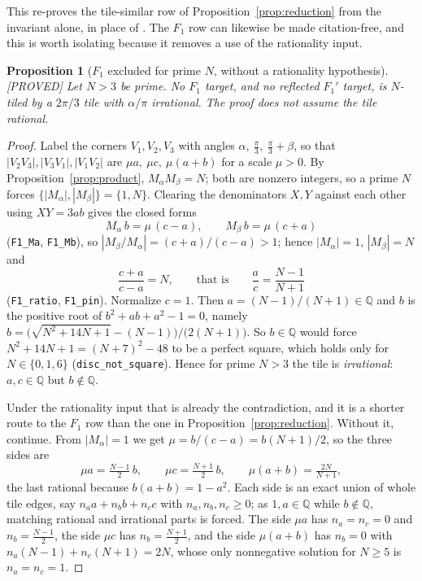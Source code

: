 \documentclass[11pt,reqno]{amsart}
\theoremstyle{plain}
\newtheorem{proposition}[theorem]{Proposition}
\theoremstyle{definition}
\newcommand{\Q}{\mathbb{Q}}
\newcommand{\lab}[1]{\hfill\textnormal{\footnotesize\textsc{[#1]}}}
\begin{document}
\noindent This re-proves the tile-similar row of Proposition~\ref{prop:reduction} from the invariant
alone, in place of \cite{SWW, BeesonI}. The $F_1$ row can likewise be made citation-free, and this is
worth isolating because it removes a use of the rationality input.

\begin{proposition}[$F_1$ excluded for prime $N$, without a rationality hypothesis]\label{prop:F1free}\lab{PROVED}
Let $N>3$ be prime. No $F_1$ target, and no reflected $F_1'$ target, is $N$-tiled by a $2\pi/3$ tile
with $\alpha/\pi$ irrational. The proof does not assume the tile rational.
\end{proposition}

\begin{proof}
Label the corners $V_1,V_2,V_3$ with angles $\alpha,\ \frac\pi3,\ \frac\pi3+\beta$, so that
$|V_2V_3|,|V_3V_1|,|V_1V_2|$ are $\mu a,\ \mu c,\ \mu(a+b)$ for a scale $\mu>0$. By
Proposition~\ref{prop:product}, $M_\alpha M_\beta=N$; both are nonzero integers, so a prime $N$
forces $\{|M_\alpha|,|M_\beta|\}=\{1,N\}$. Clearing the denominators $X,Y$ against each other using
$XY=3ab$ gives the closed forms
\[
M_\alpha\,b=\mu\,(c-a),\qquad M_\beta\,b=\mu\,(c+a)
\]
(\texttt{F1\_Ma}, \texttt{F1\_Mb}), so $|M_\beta/M_\alpha|=(c+a)/(c-a)>1$; hence $|M_\alpha|=1$,
$|M_\beta|=N$ and
\[
\frac{c+a}{c-a}=N,\qquad\text{that is}\qquad \frac ac=\frac{N-1}{N+1}
\]
(\texttt{F1\_ratio}, \texttt{F1\_pin}). Normalize $c=1$. Then $a=(N-1)/(N+1)\in\Q$ and $b$ is the
positive root of $b^2+ab+a^2-1=0$, namely
$b=\bigl(\sqrt{N^2+14N+1}-(N-1)\bigr)/\bigl(2(N+1)\bigr)$. So $b\in\Q$ would force
$N^2+14N+1=(N+7)^2-48$ to be a perfect square, which holds only for $N\in\{0,1,6\}$
(\texttt{disc\_not\_square}). Hence for prime $N>3$ the tile is \emph{irrational}: $a,c\in\Q$ but
$b\notin\Q$.

Under the rationality input that is already the contradiction, and it is a shorter route to the
$F_1$ row than the one in Proposition~\ref{prop:reduction}. Without it, continue. From
$|M_\alpha|=1$ we get $\mu=b/(c-a)=b(N+1)/2$, so the three sides are
\[
\mu a=\tfrac{N-1}2\,b,\qquad \mu c=\tfrac{N+1}2\,b,\qquad \mu(a+b)=\tfrac{2N}{N+1},
\]
the last rational because $b(a+b)=1-a^2$. Each side is an exact union of whole tile edges, say
$n_aa+n_bb+n_cc$ with $n_a,n_b,n_c\ge0$; as $1,a\in\Q$ while $b\notin\Q$, matching rational and
irrational parts is forced. The side $\mu a$ has $n_a=n_c=0$ and $n_b=\frac{N-1}2$, the side $\mu c$
has $n_b=\frac{N+1}2$, and the side $\mu(a+b)$ has $n_b=0$ with
$n_a(N-1)+n_c(N+1)=2N$, whose only nonnegative solution for $N\ge5$ is $n_a=n_c=1$.


\end{proof}
\end{document}
